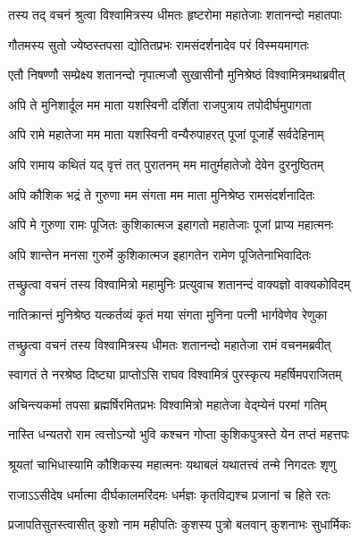 
\twolineshloka
{तस्य तद् वचनं श्रुत्वा विश्वामित्रस्य धीमतः}
{हृष्टरोमा महातेजाः शतानन्दो महातपाः} %

\twolineshloka
{गौतमस्य सुतो ज्येष्ठस्तपसा द्योतितप्रभः}
{रामसंदर्शनादेव परं विस्मयमागतः} %

\twolineshloka
{एतौ निषण्णौ सम्प्रेक्ष्य शतानन्दो नृपात्मजौ}
{सुखासीनौ मुनिश्रेष्ठं विश्वामित्रमथाब्रवीत्} %

\twolineshloka
{अपि ते मुनिशार्दूल मम माता यशस्विनी}
{दर्शिता राजपुत्राय तपोदीर्घमुपागता} %

\twolineshloka
{अपि रामे महातेजा मम माता यशस्विनी}
{वन्यैरुपाहरत् पूजां पूजार्हे सर्वदेहिनाम्} %

\twolineshloka
{अपि रामाय कथितं यद् वृत्तं तत् पुरातनम्}
{मम मातुर्महातेजो देवेन दुरनुष्ठितम्} %

\twolineshloka
{अपि कौशिक भद्रं ते गुरुणा मम संगता}
{मम माता मुनिश्रेष्ठ रामसंदर्शनादितः} %

\twolineshloka
{अपि मे गुरुणा रामः पूजितः कुशिकात्मज}
{इहागतो महातेजाः पूजां प्राप्य महात्मनः} %

\twolineshloka
{अपि शान्तेन मनसा गुरुर्मे कुशिकात्मज}
{इहागतेन रामेण पूजितेनाभिवादितः} %

\twolineshloka
{तच्छ्रुत्वा वचनं तस्य विश्वामित्रो महामुनिः}
{प्रत्युवाच शतानन्दं वाक्यज्ञो वाक्यकोविदम्} %

\twolineshloka
{नातिक्रान्तं मुनिश्रेष्ठ यत्कर्तव्यं कृतं मया}
{संगता मुनिना पत्नी भार्गवेणेव रेणुका} %

\twolineshloka
{तच्छ्रुत्वा वचनं तस्य विश्वामित्रस्य धीमतः}
{शतानन्दो महातेजा रामं वचनमब्रवीत्} %

\twolineshloka
{स्वागतं ते नरश्रेष्ठ दिष्ट्या प्राप्तोऽसि राघव}
{विश्वामित्रं पुरस्कृत्य महर्षिमपराजितम्} %

\twolineshloka
{अचिन्त्यकर्मा तपसा ब्रह्मर्षिरमितप्रभः}
{विश्वामित्रो महातेजा वेद्म्येनं परमां गतिम्} %

\twolineshloka
{नास्ति धन्यतरो राम त्वत्तोऽन्यो भुवि कश्चन}
{गोप्ता कुशिकपुत्रस्ते येन तप्तं महत्तपः} %

\twolineshloka
{श्रूयतां चाभिधास्यामि कौशिकस्य महात्मनः}
{यथाबलं यथातत्त्वं तन्मे निगदतः शृणु} %

\twolineshloka
{राजाऽऽसीदेष धर्मात्मा दीर्घकालमरिंदमः}
{धर्मज्ञः कृतविद्यश्च प्रजानां च हिते रतः} %

\twolineshloka
{प्रजापतिसुतस्त्वासीत् कुशो नाम महीपतिः}
{कुशस्य पुत्रो बलवान् कुशनाभः सुधार्मिकः} %

